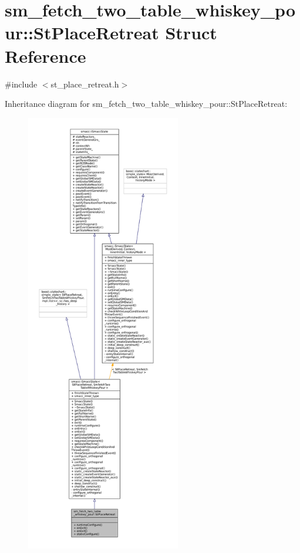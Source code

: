 \hypertarget{structsm__fetch__two__table__whiskey__pour_1_1StPlaceRetreat}{}\section{sm\+\_\+fetch\+\_\+two\+\_\+table\+\_\+whiskey\+\_\+pour\+:\+:St\+Place\+Retreat Struct Reference}
\label{structsm__fetch__two__table__whiskey__pour_1_1StPlaceRetreat}


{\ttfamily \#include $<$st\+\_\+place\+\_\+retreat.\+h$>$}



Inheritance diagram for sm\+\_\+fetch\+\_\+two\+\_\+table\+\_\+whiskey\+\_\+pour\+:\+:St\+Place\+Retreat\+:
\nopagebreak
\begin{figure}[H]
\begin{center}
\leavevmode
\includegraphics[height=550pt]{structsm__fetch__two__table__whiskey__pour_1_1StPlaceRetreat__inherit__graph}
\end{center}
\end{figure}



